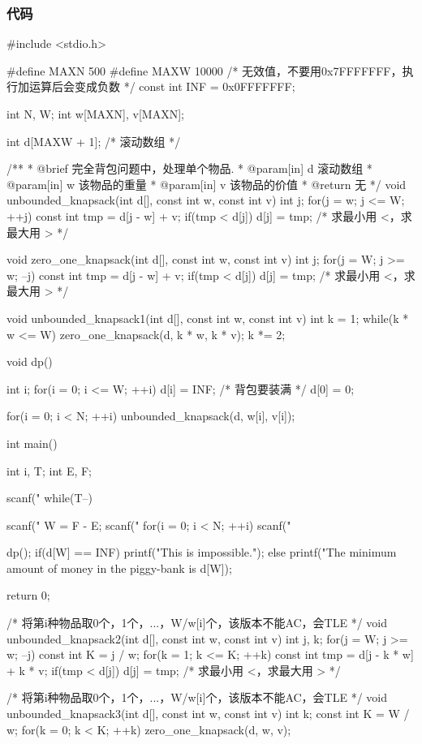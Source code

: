 \subsubsection{代码}
\begin{Codex}[label=piggy_bank.c]
#include <stdio.h>

#define MAXN 500
#define MAXW 10000
 /* 无效值，不要用0x7FFFFFFF，执行加运算后会变成负数 */
const int INF = 0x0FFFFFFF;

int N, W;
int w[MAXN], v[MAXN];

int d[MAXW + 1]; /* 滚动数组 */

/**
 * @brief 完全背包问题中，处理单个物品.
 * @param[in] d 滚动数组
 * @param[in] w 该物品的重量
 * @param[in] v 该物品的价值
 * @return 无
 */
void unbounded_knapsack(int d[], const int w, const int v) {
    int j;
    for(j = w; j <= W; ++j) {
        const int tmp = d[j - w] + v;
        if(tmp < d[j]) d[j] = tmp; /* 求最小用 <，求最大用 > */
    }
}

void zero_one_knapsack(int d[], const int w, const int v) {
    int j;
    for(j = W; j >= w; --j) {
        const int tmp = d[j - w] + v;
        if(tmp < d[j]) d[j] = tmp;  /* 求最小用 <，求最大用 > */
    }
}

void unbounded_knapsack1(int d[], const int w, const int v) {
    int k = 1;
    while(k * w <= W) {
        zero_one_knapsack(d, k * w, k * v);
        k *= 2;
    }
}

void dp() {
    int i;
    for(i = 0; i <= W; ++i) d[i] = INF; /* 背包要装满 */
    d[0] = 0;

    for(i = 0; i < N; ++i) unbounded_knapsack(d, w[i], v[i]);
}

int main() {    
    int i, T;
    int E, F;
 
    scanf("%
    while(T--) {
        scanf("%
        W = F - E;
        scanf("%
        for(i = 0; i < N; ++i) scanf("%

        dp();
        if(d[W] == INF) {
            printf("This is impossible.\n");
        } else {
            printf("The minimum amount of money in the piggy-bank is %
                    d[W]);
        }
    }
    return 0;
}

/* 将第i种物品取0个，1个，...，W/w[i]个，该版本不能AC，会TLE */
void unbounded_knapsack2(int d[], const int w, const int v) {
    int j, k;
    for(j = W; j >= w; --j) {
        const int K = j / w;
        for(k = 1; k <= K; ++k) {
            const int tmp = d[j - k * w] + k * v;
            if(tmp < d[j]) d[j] = tmp; /* 求最小用 <，求最大用 > */
        }
    }
}

/* 将第i种物品取0个，1个，...，W/w[i]个，该版本不能AC，会TLE */
void unbounded_knapsack3(int d[], const int w, const int v) {
    int k;
    const int K = W / w;
    for(k = 0; k < K; ++k){
        zero_one_knapsack(d, w, v);
    }
}
\end{Codex}

